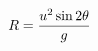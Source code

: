 \documentclass[preview]{standalone}
\begin{document}
\begin{align*}
\special{dvisvgm:raw <g id='unique000'>}R = \frac{u^2 \sin 2\theta}{g}\special{dvisvgm:raw </g>}
\end{align*}
\end{document}
